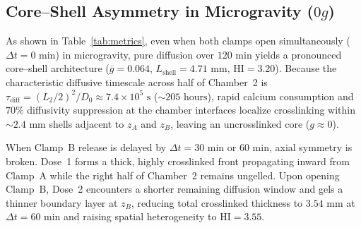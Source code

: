 \documentclass[11pt,twocolumn]{article}
\begin{document}
\begin{table}[htbp]
\centering
\caption{Chamber 2 Gelation Metrics at $t = 120\text{ min}$.}
\label{tab:metrics}
\setlength{\tabcolsep}{4pt}
\end{table}



\subsection{Core--Shell Asymmetry in Microgravity ($0g$)}
As shown in Table~\ref{tab:metrics}, even when both clamps open simultaneously ($\Delta t = 0\text{ min}$) in microgravity, pure diffusion over $120\text{ min}$ yields a pronounced core--shell architecture ($\bar{g} = 0.064$, $L_{\mathrm{shell}} = 4.71\text{ mm}$, $\mathrm{HI} = 3.20$). Because the characteristic diffusive timescale across half of Chamber~2 is $\tau_{\mathrm{diff}} = (L_2/2)^2 / D_0 \approx 7.4 \times 10^5\text{ s}$ ($\sim 205\text{ hours}$), rapid calcium consumption and $70\%$ diffusivity suppression at the chamber interfaces localize crosslinking within $\sim 2.4\text{ mm}$ shells adjacent to $z_A$ and $z_B$, leaving an uncrosslinked core ($g \approx 0$).

When Clamp~B release is delayed by $\Delta t = 30\text{ min}$ or $60\text{ min}$, axial symmetry is broken. Dose~1 forms a thick, highly crosslinked front propagating inward from Clamp~A while the right half of Chamber~2 remains ungelled. Upon opening Clamp~B, Dose~2 encounters a shorter remaining diffusion window and gels a thinner boundary layer at $z_B$, reducing total crosslinked thickness to $3.54\text{ mm}$ at $\Delta t = 60\text{ min}$ and raising spatial heterogeneity to $\mathrm{HI} = 3.55$.
\end{document}
